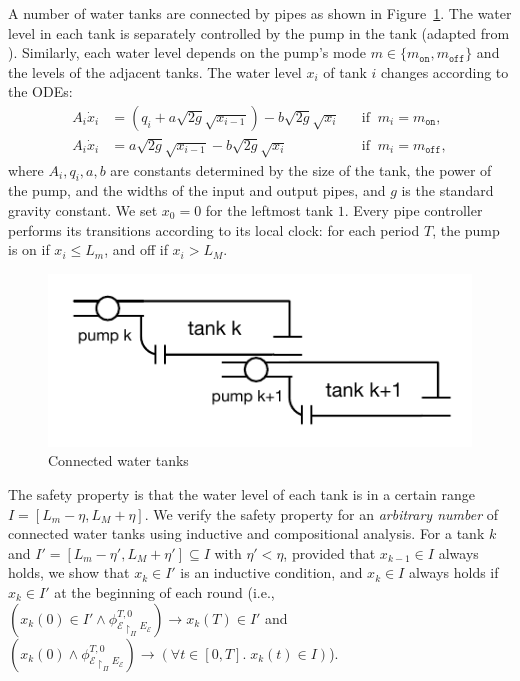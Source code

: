 A number of water tanks are connected by pipes as shown in Figure~\ref{fig:water}.
The water level in each tank is separately controlled by the pump in the tank
(adapted from \cite{kowalewski1999case,raisch1999approximating}).
Similarly, each water level depends on the pump's mode $m \in \{m_\texttt{on}, m_\texttt{off}\}$
and the levels of the adjacent tanks.
The water level $x_i$ of tank $i$ changes according to the ODEs:
\[
\begin{aligned}
A_i \dot{x}_i &=  (q_i + a \sqrt{2g} \sqrt{x_{i-1}})  - b \sqrt{2g} \sqrt{x_i}
&& \mbox{if}\;\; m_i = m_\texttt{on},
\\
A_i \dot{x}_i &= a \sqrt{2g} \sqrt{x_{i-1}}  - b \sqrt{2g} \sqrt{x_i}
&& \mbox{if}\;\; m_i = m_\texttt{off},
\end{aligned}
\]
where $A_i, q_i, a, b $ are constants determined by the size of the tank, the power of the pump, 
and the widths of the input and output pipes,
and $g$ is the standard gravity constant. We set $x_0 = 0$ for the leftmost tank $1$.
%
Every pipe controller performs its transitions according to its local clock:
for each period $T$, 
the pump is on if $x_i \leq L_m$, and off if $x_i > L_M$.

\begin{figure}
\centering
\includegraphics[clip=true,trim=0.3cm 0.35cm 0.3cm 0.35cm,width=0.6\columnwidth]{water.pdf}    
\caption{Connected water tanks}  \label{fig:water}
\end{figure}

The safety property is that the water level of each tank is in a certain range
$I = [L_m - \eta, L_M + \eta]$.
%
We verify the safety property for an \emph{arbitrary number} of connected water tanks 
using inductive and compositional analysis.
For a tank $k$ and %
$I' = [L_m - \eta', L_M + \eta']\subseteq I$ with $\eta' < \eta$,
provided  that $x_{k-1} \in I$ always holds, %
we show that $x_{k} \in I'$ is an inductive condition,
and  $x_{k} \in I$ always holds
if $x_{k} \in I'$ at the beginning of each round
(i.e., $(x_k(0) \in I' \wedge \phi_{\mathcal{E} \restriction_{\Pi} E_\mathcal{E}}^{T,0}) \rightarrow x_k(T) \in I'$
and $(x_{k}(0) \wedge \phi_{\mathcal{E} \restriction_{\Pi} E_\mathcal{E}}^{T,0}) \rightarrow (\forall t \in [0,T].\; x_{k}(t) \in I)$).



